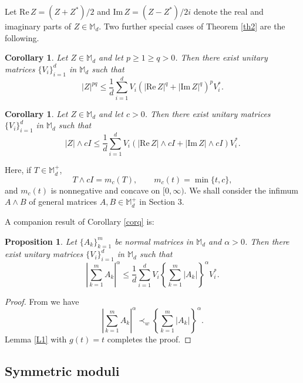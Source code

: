 \documentclass[12pt,reqno]{article}
\newtheorem{cor}[theorem]{Corollary}
\newtheorem{prop}[theorem]{Proposition}
\theoremstyle{definition}
\theoremstyle{remark}
\numberwithin{equation}{section}
\def\bM{\mathbb{M}}
\begin{document}
\vskip 5pt
Let ${\mathrm{Re\,}}Z=(Z+Z^*)/2$ and ${\mathrm{Im\,}}Z=(Z-Z^*)/2i$ denote the real and imaginary parts of $Z\in\bM_d$. Two
further special cases of Theorem \ref{th2} are the following.


\vskip 5pt
\begin{cor}\label{cartpq} Let $Z\in\bM_d$  and let $p\ge 1\ge q>0$. Then there exist unitary matrices $\{V_i\}_{i=1}^d$  in $\bM_d$ such that 
$$
\left| Z\right|^{pq} \le \frac{1}{d} \sum_{i=1}^d V_i\left(|{\mathrm{Re\,}}Z|^q+ |{\mathrm{Im\,}}Z|^q\right)^{p}V_i^*.
$$
\end{cor}


\vskip 5pt
\begin{cor} Let $Z\in\bM_d$  and let $c>0$. Then there exist unitary matrices $\{V_i\}_{i=1}^d$  in $\bM_d$ such that 
$$
\left| Z\right|\wedge cI \le \frac{1}{d} \sum_{i=1}^d V_i\left(|{\mathrm{Re\,}}Z|\wedge cI +  |{\mathrm{Im\,}}Z|\wedge cI\right)V_i^*.
$$
\end{cor}


\vskip 5pt
Here, if $T\in\bM_d^+$, $$T\wedge cI=m_c(T), \qquad   m_c(t)=\min\{t,c\},$$ and $m_c(t)$  is nonnegative and concave on $[0,\infty)$. We shall consider the infimum $A\wedge B$ of general matrices $A,B\in \bM_d^+$ in Section 3.

A companion result of Corollary \ref{corq} is:
\vskip 5pt
\begin{prop} Let $\{A_k\}_{k=1}^m$ be normal matrices in $\bM_d$ and $\alpha>0$. Then there exist unitary matrices $\{V_i\}_{i=1}^d$  in $\bM_d$ such that 
$$
\left|\sum_{k=1}^m A_k \right|^{\alpha} \le \frac{1}{d} \sum_{i=1}^d V_i\left\{\sum_{k=1}^m |A_k|\right\}^{\alpha}\!\!V_i^*.
$$
\end{prop}


\vskip 5pt
\begin{proof} From  \cite[Corollary 2.10]{BLtv} we have 
$$
\left|\sum_{k=1}^m A_k \right|^{\alpha}\prec_w \left\{\sum_{k=1}^m |A_k|\right\}^{\alpha}.
$$
Lemma \ref{L1} with $g(t)=t$
 completes the proof.
\end{proof}


\subsection{Symmetric moduli}
\end{document}
